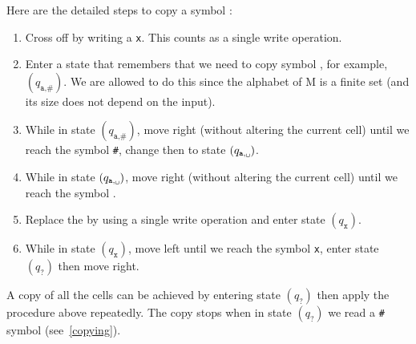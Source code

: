 \documentclass{article}
\newcommand\obullet[1]{\ThisStyle{\ensurestackMath{%
  \stackon[1pt]{\SavedStyle#1}{\SavedStyle\kern.6\LMpt\bullet}}}}
\newcommand{\0}{\texttt{\textvisiblespace}}
\newcommand{\°}{\obullet{\0}}
\newcommand{\s}{\texttt{a}}
\newcommand{\X}{\texttt{x}}
\newcommand{\e}{\texttt{\#}}
\begin{document}
Here are the detailed steps to copy a symbol \obullet{\s}:
\begin{enumerate}
	\item Cross off \obullet{\s} by writing a \X{}. This
		counts as a single write operation.
	\item Enter a state that remembers that we need to copy symbol
		\obullet{\s}, for example, \((q_{\texttt{a},\e})\). We are allowed
		to do this since the alphabet of M is a finite set (and its size does not
		depend on the input).
	\item While in state \((q_{\texttt{a},\e})\), move right (without
		altering the current cell) until we reach
		the symbol \e, change then to state
		\((q_{\texttt{a},\0{}})\).
	\item While in state \((q_{\texttt{a},\0{}})\), move right (without
	altering the current cell) until we reach the symbol \0{}.
	\item Replace the \0{} by \obullet{\s} using a
		single write operation and enter state \((q_{\texttt{x}})\).
	\item While in state \((q_{\texttt{x}})\), move left until we reach
		the symbol \X{}, enter state \((q_{\texttt{?}})\)
		then move right.
\end{enumerate}
A copy of all the cells can be achieved by entering state \((q_{\texttt{?}})\)
then apply the procedure above repeatedly.
The copy stops when in state \((q_{\texttt{?}})\) we read a \e{}
symbol (see~\ref{copying}).
\end{document}
